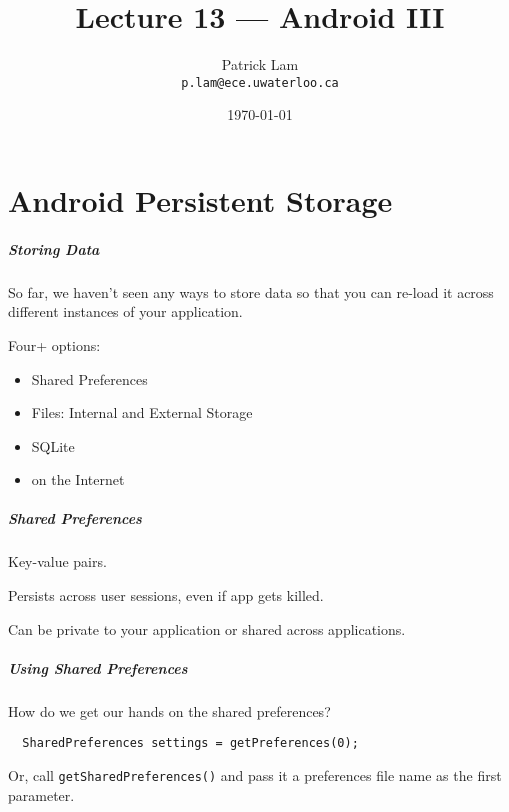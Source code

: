 

\title{Lecture 13 --- Android III}

\author{Patrick Lam \\ \small \texttt{p.lam@ece.uwaterloo.ca}}
\date{\today}




\begin{frame}
  \titlepage
\end{frame}

\part{Android Persistent Storage}

\begin{frame}
\partpage
\end{frame}




\begin{frame}
\frametitle{Storing Data}

\begin{changemargin}{1cm}
So far, we haven't seen any ways to store data so that you can re-load
it across different instances of your application.


Four+ options:
\begin{itemize}
\item Shared Preferences
\item Files: Internal and External Storage
\item SQLite
\item on the Internet
\end{itemize}
\end{changemargin}
\end{frame}

\begin{frame}
\frametitle{Shared Preferences}

\begin{changemargin}{1cm}
Key-value pairs.

Persists across user sessions, even if app gets killed.

Can be private to your application or shared across applications.
\end{changemargin}

\end{frame}


\begin{frame}[fragile]
\frametitle{Using Shared Preferences}
\begin{changemargin}{1cm}

How do we get our
hands on the shared preferences?
\begin{verbatim}
  SharedPreferences settings = getPreferences(0);
\end{verbatim}
Or, call {\tt getSharedPreferences()} and pass it a preferences file
name as the first parameter.
\end{changemargin}
\end{frame}

